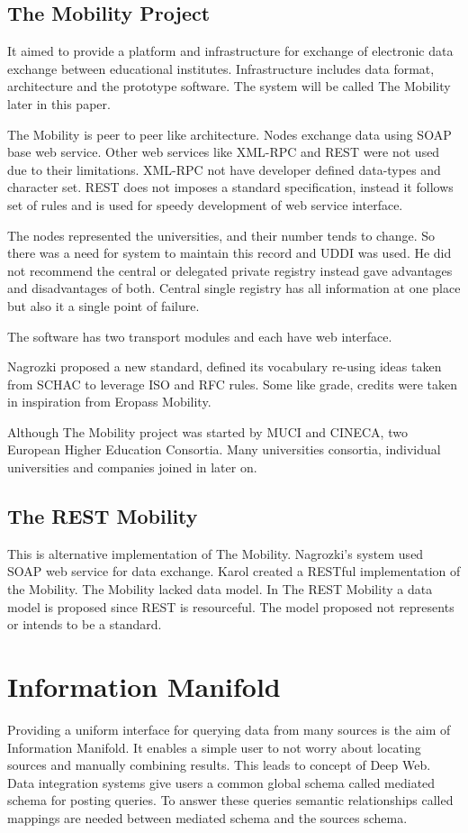 \documentclass[12pt,a4paper,oneside]{book}
\begin{document}
    \subsection{The Mobility Project}
    It aimed to provide a platform and infrastructure for exchange of electronic data exchange between educational institutes. Infrastructure includes data format, architecture and the prototype software. The system will be called The Mobility later in this paper.

    The Mobility is peer to peer like architecture. Nodes exchange data using SOAP base web service. Other web services like XML-RPC and REST were not used due to their limitations. XML-RPC not have developer defined data-types and character set. REST does not imposes a standard specification, instead it follows set of rules and is used for speedy development of web service interface.

    The nodes represented the universities, and their number tends to change. So there was a need for system to maintain this record and UDDI was used. He did not recommend the central or delegated private registry instead gave advantages and disadvantages of both. Central single registry has all information at one place but also it a single point of failure.

    The software has two transport modules and each have web interface.

    Nagrozki proposed a new standard, defined its vocabulary re-using ideas taken from SCHAC to leverage ISO and RFC rules. Some like grade, credits were taken in inspiration from Eropass Mobility.

    Although The Mobility project was started by MUCI and CINECA, two European Higher Education Consortia. Many universities consortia, individual universities and companies joined in later on.

    \subsection{The REST Mobility}
    This is alternative implementation of The Mobility. Nagrozki's system used SOAP web service for data exchange. Karol created a RESTful implementation of the Mobility. The Mobility lacked data model. In The REST Mobility a data model is proposed since REST is resourceful. The model proposed not represents or intends to be a standard.

\section{Information Manifold}
Providing a uniform interface for querying data from many sources is the aim of Information Manifold. It enables a simple user to not worry about locating sources and manually combining results. This leads to concept of Deep Web. Data integration systems give users a common global schema called mediated schema for posting queries. To answer these queries semantic relationships called mappings are needed between mediated schema and the sources schema.
\end{document}
